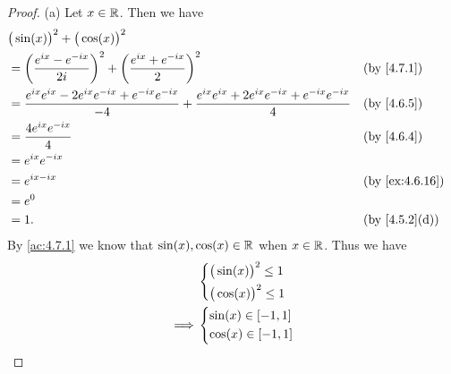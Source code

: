 \begin{proof}{(a)}
  Let \(x \in \mathbb{R}\).
  Then we have
  \begin{align*}
     & \big(\sin(x)\big)^2 + \big(\cos(x)\big)^2                                                                                                                                           \\
     & = \bigg(\dfrac{e^{i x} - e^{- i x}}{2i}\bigg)^2 + \bigg(\dfrac{e^{i x} + e^{- i x}}{2}\bigg)^2                                                     &  & \by{4.7.1}                  \\
     & = \dfrac{e^{i x} e^{i x} - 2 e^{i x} e^{- i x} + e^{- i x} e^{- i x}}{-4} + \dfrac{e^{i x} e^{i x} + 2 e^{i x} e^{- i x} + e^{- i x} e^{- i x}}{4} &  & \by{4.6.5}                  \\
     & = \dfrac{4 e^{i x} e^{- i x}}{4}                                                                                                                   &  & \by{4.6.4}                  \\
     & = e^{i x} e^{- i x}                                                                                                                                                                 \\
     & = e^{i x - i x}                                                                                                                                    &  & \by{ex:4.6.16}              \\
     & = e^0                                                                                                                                                                               \\
     & = 1.                                                                                                                                               &  & \text{(by \cref{4.5.2}(d))}
  \end{align*}
  By \cref{ac:4.7.1} we know that \(\sin(x), \cos(x) \in \mathbb{R}\) when \(x \in \mathbb{R}\).
  Thus we have
  \begin{align*}
             & \begin{dcases}
                 \big(\sin(x)\big)^2 \leq 1 \\
                 \big(\cos(x)\big)^2 \leq 1
               \end{dcases} \\
    \implies & \begin{dcases}
                 \sin(x) \in [-1, 1] \\
                 \cos(x) \in [-1, 1]
               \end{dcases}
  \end{align*}
\end{proof}

